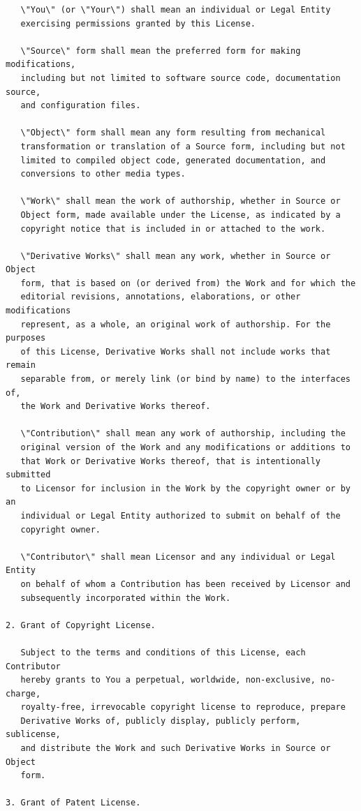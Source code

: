 \documentclass[12pt,a4paper]{article}
\theoremstyle{definition}
\theoremstyle{remark}
\begin{document}
\begin{verbatim}
   \"You\" (or \"Your\") shall mean an individual or Legal Entity
   exercising permissions granted by this License.

   \"Source\" form shall mean the preferred form for making modifications,
   including but not limited to software source code, documentation source,
   and configuration files.

   \"Object\" form shall mean any form resulting from mechanical
   transformation or translation of a Source form, including but not
   limited to compiled object code, generated documentation, and
   conversions to other media types.

   \"Work\" shall mean the work of authorship, whether in Source or
   Object form, made available under the License, as indicated by a
   copyright notice that is included in or attached to the work.

   \"Derivative Works\" shall mean any work, whether in Source or Object
   form, that is based on (or derived from) the Work and for which the
   editorial revisions, annotations, elaborations, or other modifications
   represent, as a whole, an original work of authorship. For the purposes
   of this License, Derivative Works shall not include works that remain
   separable from, or merely link (or bind by name) to the interfaces of,
   the Work and Derivative Works thereof.

   \"Contribution\" shall mean any work of authorship, including the
   original version of the Work and any modifications or additions to
   that Work or Derivative Works thereof, that is intentionally submitted
   to Licensor for inclusion in the Work by the copyright owner or by an
   individual or Legal Entity authorized to submit on behalf of the
   copyright owner.

   \"Contributor\" shall mean Licensor and any individual or Legal Entity
   on behalf of whom a Contribution has been received by Licensor and
   subsequently incorporated within the Work.

2. Grant of Copyright License.

   Subject to the terms and conditions of this License, each Contributor
   hereby grants to You a perpetual, worldwide, non-exclusive, no-charge,
   royalty-free, irrevocable copyright license to reproduce, prepare
   Derivative Works of, publicly display, publicly perform, sublicense,
   and distribute the Work and such Derivative Works in Source or Object
   form.

3. Grant of Patent License.


\end{verbatim}
\end{document}
